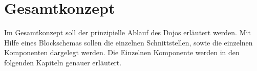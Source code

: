 \chapter{Gesamtkonzept}
\thispagestyle{fancy} 
Im Gesamtkonzept soll der prinzipielle Ablauf des Dojos erläutert werden. Mit Hilfe eines Blockschemas sollen die einzelnen Schnittstellen, sowie die einzelnen Komponenten dargelegt werden. Die Einzelnen Komponente werden in den folgenden Kapiteln genauer erläutert.
